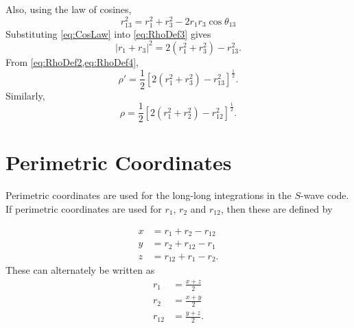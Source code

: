 \documentclass[Dissertation.tex]{subfiles}
\begin{document}
Also, using the law of cosines,
\begin{equation}
r_{13}^2 = r_1^2 + r_3^2 - 2 r_1 r_3 \cos \theta_{13}
\label{eq:CosLaw}
\end{equation}
Substituting \cref{eq:CosLaw} into \cref{eq:RhoDef3} gives
\begin{equation}
\left| r_1 + r_3 \right|^2 = 2 \left( r_1^2 + r_3^2 \right) - r_{13}^2.
\label{eq:RhoDef4}
\end{equation}
From \cref{eq:RhoDef2,eq:RhoDef4},
\begin{equation}
\label{eq:RhopRDef}
\rho' = \frac{1}{2} \left[ 2 \left(r_1^2 + r_3^2 \right) - r_{13}^2 \right] ^ \frac{1}{2}.
\end{equation}
Similarly,
\begin{equation}
\label{eq:RhoRDef}
\rho = \frac{1}{2} \left[ 2 \left(r_1^2 + r_2^2 \right) - r_{12}^2 \right] ^ \frac{1}{2}.
\end{equation}


\section{Perimetric Coordinates}
\label{sec:PerimetricCoords}

Perimetric coordinates are used for the long-long integrations in the $S$-wave
code. If perimetric coordinates are used for $r_1$, $r_2$ and $r_{12}$, then
these are defined by \cite{Armour1991}

\begin{align}
\label{eq:PerimetricCoords1}
\nonumber x &= r_1 + r_2 - r_{12} \\
\nonumber y &= r_2 + r_{12} - r_1 \\
z &= r_{12} + r_1 - r_2.
\end{align}
These can alternately be written as
\begin{align}
\label{eq:PerimetricCoords2}
\nonumber r_1 &= \frac{x+z}{2} \\
\nonumber r_2 &= \frac{x+y}{2} \\
r_{12} &= \frac{y+z}{2}.
\end{align}
\end{document}
